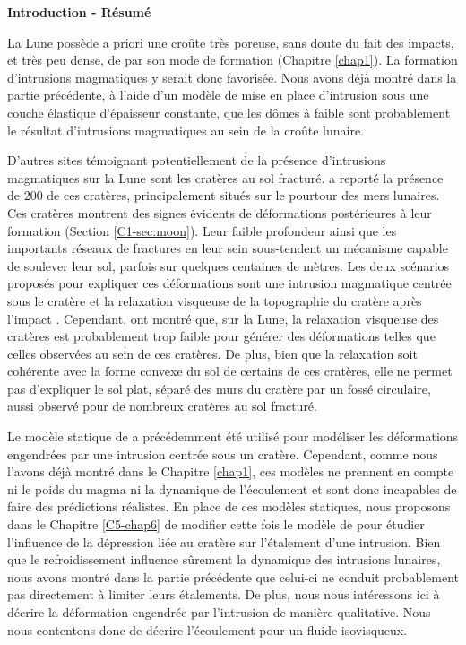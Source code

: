 \thispagestyle{plain}
\begin{flushleft}
 \Large \vspace{.5cm} \textbf{Introduction - Résumé}
\end{flushleft}

La Lune possède a priori une croûte très poreuse, sans doute du fait
des impacts, et très peu dense, de par son mode de formation (Chapitre
\ref{chap1}). La formation d’intrusions magmatiques y serait donc
favorisée. Nous avons déjà montré dans la partie précédente, à l’aide
d’un modèle de mise en place d’intrusion sous une couche élastique
d’épaisseur constante, que les dômes à faible sont probablement le
résultat d’intrusions magmatiques au sein de la croûte lunaire.

D’autres sites témoignant potentiellement de la présence d’intrusions
magmatiques sur la Lune sont les cratères au sol fracturé.
\citet{Schultz:1976kt} a reporté la présence de $200$ de ces cratères,
principalement situés sur le pourtour des mers lunaires. Ces cratères
montrent des signes évidents de déformations postérieures à leur
formation (Section \ref{C1-sec:moon}). Leur faible profondeur ainsi
que les importants réseaux de fractures en leur sein sous-tendent un
mécanisme capable de soulever leur sol, parfois sur quelques centaines
de mètres. Les deux scénarios proposés pour expliquer ces déformations
sont une intrusion magmatique centrée sous le cratère et la relaxation
visqueuse de la topographie du cratère après l’impact
\citep{Wichman:1996bj}. Cependant, \citet{Dombard:2001gs} ont montré
que, sur la Lune, la relaxation visqueuse des cratères est
probablement trop faible pour générer des déformations telles que
celles observées au sein de ces cratères. De plus, bien que la
relaxation soit cohérente avec la forme convexe du sol de certains de
ces cratères, elle ne permet pas d’expliquer le sol plat, séparé des
murs du cratère par un fossé circulaire, aussi observé pour de
nombreux cratères au sol fracturé.

Le modèle statique de \citet{Pollard:1973ho} a précédemment été
utilisé pour modéliser les déformations engendrées par une intrusion
centrée sous un cratère. Cependant, comme nous l’avons déjà montré
dans le Chapitre \ref{chap1}, ces modèles ne prennent en compte ni le
poids du magma ni la dynamique de l’écoulement et sont donc incapables
de faire des prédictions réalistes. En place de ces modèles statiques,
nous proposons dans le Chapitre \ref{C5-chap6} de modifier cette fois
le modèle de \citet{Michaut:2011kg} pour étudier l’influence de la
dépression liée au cratère sur l’étalement d’une intrusion. Bien que
le refroidissement influence sûrement la dynamique des intrusions
lunaires, nous avons montré dans la partie précédente que celui-ci ne
conduit probablement pas directement à limiter leurs étalements. De
plus, nous nous intéressons ici à décrire la déformation engendrée par
l’intrusion de manière qualitative. Nous nous contentons donc de
décrire l’écoulement pour un fluide isovisqueux.

